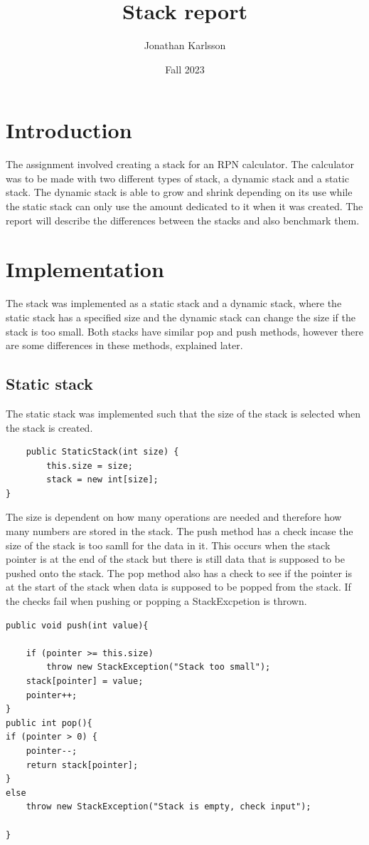 \documentclass[a4paper,11pt]{article}
\begin{document}
\title{
    \textbf{Stack report}
}
\author{Jonathan Karlsson}
\date{Fall 2023}

\maketitle

\section*{Introduction}

The assignment involved creating a stack for an RPN calculator. The calculator was to be made with two different types of stack, 
a dynamic stack and a static stack. The dynamic stack is able to grow and shrink depending on its use while the static stack can only
use the amount dedicated to it when it was created. The report will describe the differences between the stacks and also benchmark them.

\section*{Implementation}

The stack was implemented as a static stack and a dynamic stack, where the static stack has a 
specified size and the dynamic stack can change the size if the stack is too small.
Both stacks have similar pop and push methods, however there are some differences in these methods, explained later.


\subsection*{Static stack}
The static stack was implemented such that the size of the stack is selected when the stack is created.
\begin{verbatim}
    public StaticStack(int size) {
        this.size = size;
        stack = new int[size];
}
\end{verbatim}
The size is dependent on how many operations are needed and therefore how many numbers are stored in the
stack. The push method has a check incase the size of the stack is too samll for the data in it.
This occurs when the stack pointer is at the end of the stack but there is still data that is supposed to 
be pushed onto the stack. The pop method also has a check to see if the pointer is at the start of the stack
when data is supposed to be popped from the stack. If the checks fail when pushing or popping a StackExcpetion is thrown.
\begin{verbatim}
public void push(int value){
    
    if (pointer >= this.size)
        throw new StackException("Stack too small");
    stack[pointer] = value;
    pointer++;
}    
public int pop(){
if (pointer > 0) {
    pointer--;
    return stack[pointer];
}
else 
    throw new StackException("Stack is empty, check input");

}  
\end{verbatim}
\end{document}
